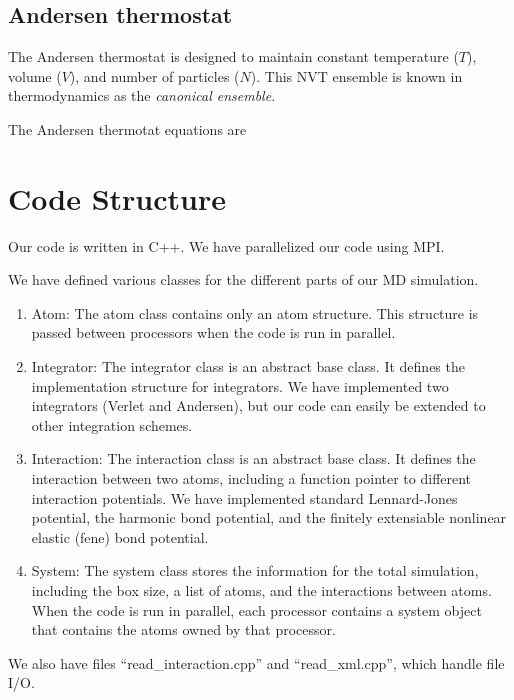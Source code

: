 \documentclass[10pt]{article}
\begin{document}
\subsection{Andersen thermostat}
The Andersen thermostat is designed to maintain constant temperature ($T$), volume ($V$), and number of particles ($N$).  
%
This NVT ensemble is known in thermodynamics as the {\em canonical ensemble}.

The Andersen thermotat equations are

\section{Code Structure}
Our code is written in C++. 
%
We have parallelized our code using MPI. 
%

We have defined various classes for the different parts of our MD simulation. 
%
\begin{enumerate}
\item Atom: The atom class contains only an atom structure. This structure is passed between processors when the code is run in parallel.
\item Integrator: The integrator class is an abstract base class. It defines the implementation structure for integrators. We have implemented two integrators (Verlet and Andersen), but our code can easily be extended to other integration schemes. 
\item Interaction: The interaction class is an abstract base class. It defines the interaction between two atoms, including a function pointer to different interaction potentials. We have implemented standard Lennard-Jones potential, the harmonic bond potential, and the finitely extensiable nonlinear elastic (fene) bond potential. 
\item System: The system class stores the information for the total simulation, including the box size, a list of atoms, and the interactions between atoms. When the code is run in parallel, each processor contains a system object that contains the atoms owned by that processor.
\end{enumerate}

We also have files ``read\_interaction.cpp'' and ``read\_xml.cpp'', which handle file I/O. 
%
\end{document}
